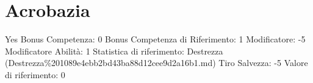 \section{Acrobazia}\label{acrobazia}

\begin{description}
\tightlist
\item[Tags: ABI]
Yes Bonus Competenza: 0 Bonus Competenza di Riferimento: 1 Modificatore:
-5 Modificatore Abilità: 1 Statistica di riferimento: Destrezza
(Destrezza\%201089e4ebb2bd43ba88d12cee9d2a16b1.md) Tiro Salvezza: -5
Valore di riferimento: 0
\end{description}
